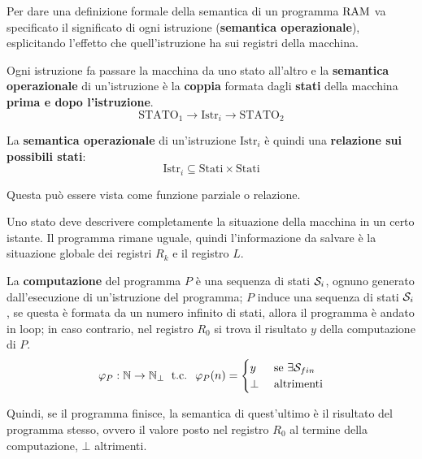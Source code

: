 Per dare una definizione formale della semantica di un programma $\text{RAM}$ va specificato il significato di ogni istruzione (\textbf{semantica operazionale}), esplicitando l'effetto che quell'istruzione ha sui registri della macchina.

Ogni istruzione fa passare la macchina da uno stato all'altro e la \textbf{semantica operazionale} di un'istruzione è la \textbf{coppia} formata dagli \textbf{stati} della macchina \textbf{prima e dopo l'istruzione}.
$$ \text{STATO}_1 \rightarrow \boxed{\text{Istr}_i} \rightarrow \text{STATO}_2 $$

La \textbf{semantica operazionale} di un'istruzione $\text{Istr}_i$ è quindi una \textbf{relazione sui possibili stati}:
$$
\text{Istr}_i \subseteq \text{Stati} \times \text{Stati}
$$

Questa può essere vista come funzione parziale o relazione.

Uno stato deve descrivere completamente la situazione della macchina in un certo istante. Il programma rimane uguale, quindi l'informazione da salvare è la situazione globale dei registri $R_k$ e il registro $L$.

La \textbf{computazione} del programma $P$ è una sequenza di stati $\mathcal{S}_i$, ognuno generato dall'esecuzione di un'istruzione del programma; $P$ induce una sequenza di stati $\mathcal{S}_i$, se questa è formata da un numero infinito di stati, allora il programma è andato in loop; in caso contrario, nel registro $R_0$ si trova il risultato $y$ della computazione di $P$.
$$ 
\varphi_P: \mathbb{N} \rightarrow \mathbb{N}_\bot \; \text{ t.c. } \; \varphi_P(n) = \begin{cases}
	y & \text{ se } \exists \mathcal{S}_{fin} \\
	\bot & \text{ altrimenti}
\end{cases}
$$

Quindi, se il programma finisce, la semantica di quest'ultimo è il risultato del programma stesso, ovvero il valore posto nel registro $R_0$ al termine della computazione, $\bot$ altrimenti.


